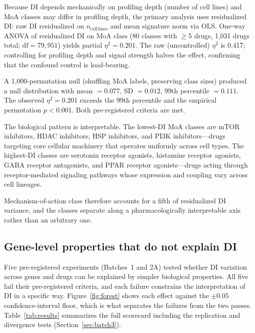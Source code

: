 \documentclass[11pt]{article}
\begin{document}
Because DI depends mechanically on profiling depth (number of cell
lines) and MoA classes may differ in profiling depth, the primary
analysis uses residualized DI: raw DI residualized on
$n_{\mathrm{cell\,lines}}$ and mean signature norm via OLS.  One-way
ANOVA of residualized DI on MoA class (80 classes with $\geq 5$ drugs,
1{,}031 drugs total; $\mathrm{df} = 79, 951$) yields partial
$\eta^2 = 0.201$.  The raw
(uncontrolled) $\eta^2$ is 0.417; controlling for profiling depth and
signal strength halves the effect, confirming that the confound control
is load-bearing.

A 1{,}000-permutation null (shuffling MoA labels, preserving class
sizes) produced a null distribution with mean $= 0.077$,
SD $= 0.012$, 99th percentile $= 0.111$.  The observed
$\eta^2 = 0.201$ exceeds the 99th percentile and the empirical
permutation $p < 0.001$.  Both pre-registered criteria are met.

The biological pattern is interpretable.  The lowest-DI MoA classes are
mTOR inhibitors, HDAC inhibitors, HSP inhibitors, and PI3K
inhibitors---drugs targeting core cellular machinery
\citep{santos2017drug} that operates uniformly across cell types.  The highest-DI classes are serotonin
receptor agonists, histamine receptor agonists, GABA receptor
antagonists, and PPAR receptor agonists---drugs acting through
receptor-mediated signaling pathways whose expression and coupling vary
across cell lineages.

Mechanism-of-action class therefore accounts for a fifth of
residualized DI variance, and the classes separate along a pharmacologically
interpretable axis rather than an arbitrary one.



\subsection{Gene-level properties that do not explain DI}
\label{sec:whatnot}

Five pre-registered experiments (Batches~1 and 2A) tested whether DI
variation across genes and drugs can be explained by simpler biological
properties.  All five fail their pre-registered criteria, and each
failure constrains the interpretation of DI in a specific way.
Figure~\ref{fig:forest} shows each effect against the $\pm 0.05$ confidence-interval
floor, which is what separates the failures from the two passes.
Table~\ref{tab:results} summarizes the full scorecard including the
replication and divergence tests (Section~\ref{sec:batch3}).
\end{document}
